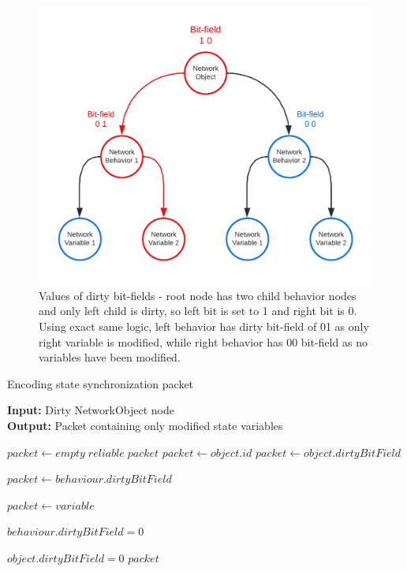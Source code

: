 \documentclass[times, utf8, diplomski]{fer}
\begin{document}
\begin{figure}[H]
	\centering
	\includegraphics[scale=0.3]{NetworkObject-bit-field}
	\caption{Values of dirty bit-fields - root node has two child behavior nodes and only left child is dirty, so left bit is set to 1 and right bit is 0. Using exact same logic, left behavior has dirty bit-field of 01 as only right variable is modified, while right behavior has 00 bit-field as no variables have been modified.}
\end{figure}

\begin{algorithm}[H]
	\caption{Encoding state synchronization packet}
	\textbf{Input:} Dirty NetworkObject node \\
	\textbf{Output:} Packet containing only modified state variables \\
	
	\begin{algorithmic}
		\State $packet \gets empty \; reliable \; packet$
		\State $packet \gets object.id$
		\State $packet \gets object.dirtyBitField$
		\State
		
			\State $packet \gets behaviour.dirtyBitField$
			\State
			
				\State $packet \gets variable$
			\EndFor
			
			\State
			\State $behaviour.dirtyBitField = 0$
		\EndFor
		
		\State
		\State $object.dirtyBitField = 0$
		\State \Return $packet$
	\end{algorithmic}
\end{algorithm}
\end{document}
